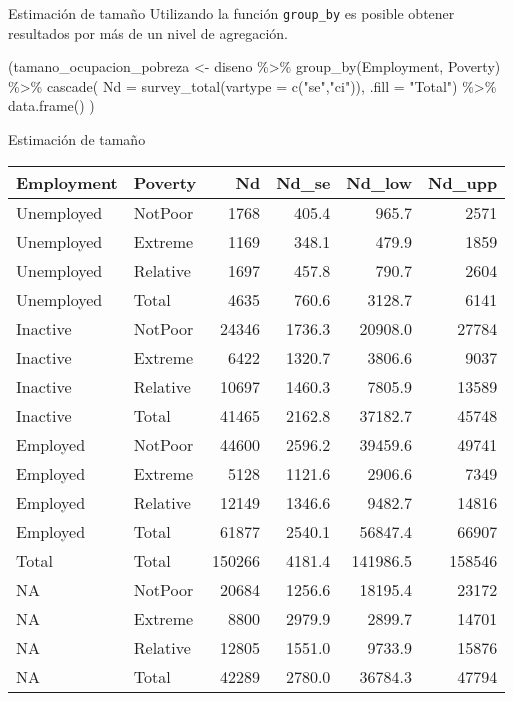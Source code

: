\documentclass[
  ignorenonframetext,
]{beamer}
\newenvironment{Shaded}{\begin{snugshade}}{\end{snugshade}}
\newcommand{\AttributeTok}[1]{\textcolor[rgb]{0.77,0.63,0.00}{#1}}
\newcommand{\FunctionTok}[1]{\textcolor[rgb]{0.00,0.00,0.00}{#1}}
\newcommand{\NormalTok}[1]{#1}
\newcommand{\OtherTok}[1]{\textcolor[rgb]{0.56,0.35,0.01}{#1}}
\newcommand{\SpecialCharTok}[1]{\textcolor[rgb]{0.00,0.00,0.00}{#1}}
\newcommand{\StringTok}[1]{\textcolor[rgb]{0.31,0.60,0.02}{#1}}
\begin{document}
\begin{frame}[fragile]{Estimación de tamaño}
\protect\hypertarget{estimaciuxf3n-de-tamauxf1o-4}{}
Utilizando la función \texttt{group\_by} es posible obtener resultados
por más de un nivel de agregación.

\begin{Shaded}
\begin{Highlighting}[]
\NormalTok{(tamano\_ocupacion\_pobreza }\OtherTok{\textless{}{-}}\NormalTok{ diseno }\SpecialCharTok{\%\textgreater{}\%} 
   \FunctionTok{group\_by}\NormalTok{(Employment, Poverty) }\SpecialCharTok{\%\textgreater{}\%} 
   \FunctionTok{cascade}\NormalTok{(}
       \AttributeTok{Nd =} \FunctionTok{survey\_total}\NormalTok{(}\AttributeTok{vartype =} \FunctionTok{c}\NormalTok{(}\StringTok{"se"}\NormalTok{,}\StringTok{"ci"}\NormalTok{)), }
       \AttributeTok{.fill =} \StringTok{"Total"}\NormalTok{) }\SpecialCharTok{\%\textgreater{}\%} 
   \FunctionTok{data.frame}\NormalTok{()}
\NormalTok{   )}
\end{Highlighting}
\end{Shaded}
\end{frame}

\begin{frame}{Estimación de tamaño}
\protect\hypertarget{estimaciuxf3n-de-tamauxf1o-5}{}
\scriptsize

\begin{longtable}[]{@{}llrrrr@{}}
\toprule
Employment & Poverty & Nd & Nd\_se & Nd\_low & Nd\_upp \\
\midrule
\endhead
Unemployed & NotPoor & 1768 & 405.4 & 965.7 & 2571 \\
Unemployed & Extreme & 1169 & 348.1 & 479.9 & 1859 \\
Unemployed & Relative & 1697 & 457.8 & 790.7 & 2604 \\
Unemployed & Total & 4635 & 760.6 & 3128.7 & 6141 \\
Inactive & NotPoor & 24346 & 1736.3 & 20908.0 & 27784 \\
Inactive & Extreme & 6422 & 1320.7 & 3806.6 & 9037 \\
Inactive & Relative & 10697 & 1460.3 & 7805.9 & 13589 \\
Inactive & Total & 41465 & 2162.8 & 37182.7 & 45748 \\
Employed & NotPoor & 44600 & 2596.2 & 39459.6 & 49741 \\
Employed & Extreme & 5128 & 1121.6 & 2906.6 & 7349 \\
Employed & Relative & 12149 & 1346.6 & 9482.7 & 14816 \\
Employed & Total & 61877 & 2540.1 & 56847.4 & 66907 \\
Total & Total & 150266 & 4181.4 & 141986.5 & 158546 \\
NA & NotPoor & 20684 & 1256.6 & 18195.4 & 23172 \\
NA & Extreme & 8800 & 2979.9 & 2899.7 & 14701 \\
NA & Relative & 12805 & 1551.0 & 9733.9 & 15876 \\
NA & Total & 42289 & 2780.0 & 36784.3 & 47794 \\
\bottomrule
\end{longtable}
\end{frame}
\end{document}
